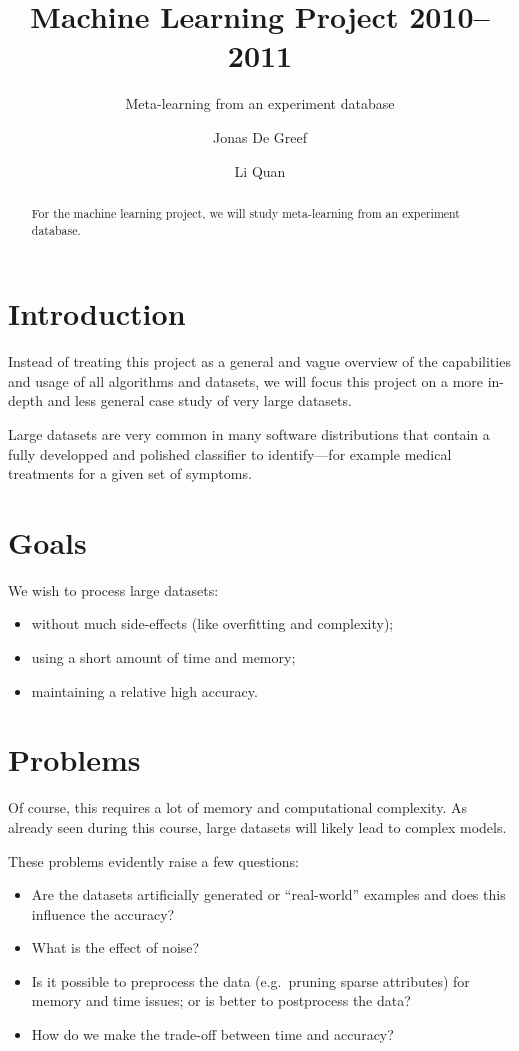 \documentclass[a4paper,10pt]{scrartcl}
\title{Machine Learning Project 2010--2011}
\subtitle{Meta-learning from an experiment database}
\author{Jonas De Greef\and Li Quan}
\date{}
\begin{document}
\maketitle
\begin{abstract}
For the machine learning project, we will study meta-learning from an experiment database\cite{Blockeel06-KDID:proc,42686}.%
\end{abstract}


\section{Introduction}
Instead of treating this project as a general and vague overview of the
capabilities and usage of all algorithms and datasets, we will focus this
project on a more in-depth and less general case study of very large datasets.

Large datasets are very common in many software distributions that contain a fully
developped and polished classifier to identify---for example medical treatments
for a given set of symptoms.

\section{Goals}
We wish to process large datasets:
\begin{itemize}
\item without much side-effects (like overfitting and complexity);
\item using a short amount of time and memory;
\item maintaining a relative high accuracy.
\end{itemize}

\section{Problems}
Of course, this requires a lot of memory and computational
complexity\cite{bottou-bousquet-2008b}. As already seen during this course, large datasets
will likely lead to complex models\cite{course,DBLP:conf/kdd/OatesJ98}.

These problems evidently raise a few questions:
\begin{itemize}
 \item Are the datasets artificially generated or ``real-world'' examples and does this influence the accuracy\cite{Pfahringer:2000:MLV:645529.658105}?
 \item What is the effect of noise?
 \item Is it possible to preprocess the data (e.g.~pruning sparse attributes) for memory and time issues; or is better to postprocess the data?
 \item How do we make the trade-off between time and accuracy?
\end{itemize}
\end{document}
